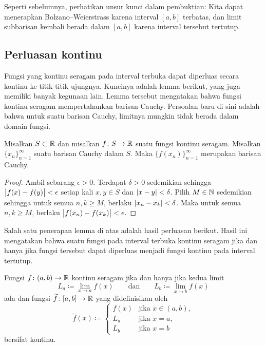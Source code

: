 Seperti sebelumnya, perhatikan unsur kunci dalam pembuktian: Kita dapat
menerapkan Bolzano--Weierstrass karena interval $[a,b]$ terbatas, dan limit
subbarisan kembali berada dalam $[a,b]$ karena interval tersebut tertutup.

\subsection{Perluasan kontinu}

Fungsi yang kontinu seragam pada interval terbuka dapat diperluas secara kontinu
ke titik-titik ujungnya.
Kuncinya adalah lemma berikut, yang juga memiliki banyak kegunaan lain.
Lemma tersebut mengatakan bahwa fungsi kontinu seragam mempertahankan barisan Cauchy.
Persoalan baru di sini adalah bahwa untuk suatu barisan Cauchy,
limitnya mungkin tidak berada dalam domain fungsi.

\begin{lemma} \label{unifcauchycauchy:lemma}
Misalkan $S \subset {\mathbb{R}}$ dan misalkan $f \colon S \to {\mathbb{R}}$ suatu fungsi kontinu seragam.  Misalkan
$\{ x_n \}_{n=1}^\infty$ suatu barisan Cauchy dalam $S$.
Maka $\bigl\{ f(x_n) \bigr\}_{n=1}^\infty$ merupakan barisan Cauchy.
\end{lemma}

\begin{proof}
Ambil sebarang $\epsilon > 0$.  Terdapat $\delta > 0$ sedemikian sehingga
$\bigl\lvert {f(x)-f(y)} \bigr\rvert < \epsilon$ setiap kali $x,y \in S$ dan $\lvert {x-y} \rvert < \delta$.  Pilih $M
\in {\mathbb{N}}$ sedemikian sehingga untuk semua $n, k \geq M$, berlaku $\lvert {x_n-x_k} \rvert < \delta$.
Maka untuk semua $n, k \geq M$, berlaku $\bigl\lvert {f(x_n)-f(x_k)} \bigr\rvert < \epsilon$.
\end{proof}

Salah satu penerapan lemma di atas adalah hasil perluasan berikut.  Hasil ini mengatakan bahwa
suatu fungsi pada interval terbuka kontinu seragam jika dan hanya jika
fungsi tersebut dapat diperluas menjadi fungsi kontinu pada interval tertutup.

\begin{prop} \label{context:prop}
Fungsi $f \colon (a,b) \to {\mathbb{R}}$ kontinu seragam jika dan hanya jika
kedua limit
\begin{equation*}
L_a \coloneqq \lim_{x \to a} f(x) \qquad \text{dan} \qquad
L_b \coloneqq \lim_{x \to b} f(x)
\end{equation*}
ada dan fungsi $\widetilde{f} \colon [a,b] \to {\mathbb{R}}$
yang didefinisikan oleh
\begin{equation*}
\widetilde{f}(x) \coloneqq
\begin{cases}
f(x) & \text{jika } x \in (a,b), \\
L_a & \text{jika } x = a, \\
L_b & \text{jika } x = b
\end{cases}
\end{equation*}
bersifat kontinu.
\end{prop}

